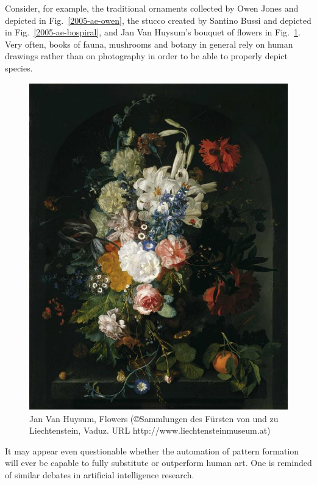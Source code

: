 \documentclass[rmp,amssymb,showpacs,showkeys,12pt,preprint]{revtex4}
\begin{document}
Consider, for example, the traditional ornaments collected by Owen Jones
\cite{jones-goo} and depicted in Fig.~\ref{2005-ae-owen}, the stucco created by Santino Bussi and
depicted in Fig.~\ref{2005-ae-bospiral}, and Jan Van Huysum's bouquet of flowers
in Fig.~\ref{2005-ae-JanVanHuysum_Blumenstrauss}.
Very often, books of fauna, mushrooms and botany in general rely on human drawings rather than on photography in order to be able to properly depict species.
\begin{figure}
\centerline{\includegraphics[width=12cm]{2008-ae-JanVanHuysum_Blumenstrauss}}
   \caption{Jan Van Huysum, Flowers
(\copyright Sammlungen des F\"ursten von und zu Liechtenstein, Vaduz.
URL http://www.liechtensteinmuseum.at)}
   \label{2005-ae-JanVanHuysum_Blumenstrauss}
 \end{figure}
It may appear even questionable whether the automation of
pattern formation will ever be capable to fully substitute or outperform
human art.
One is reminded of similar debates in artificial intelligence research.
\end{document}
